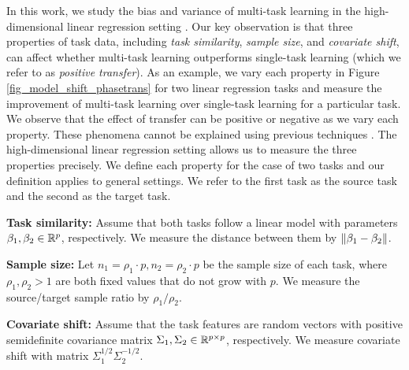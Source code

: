 In this work, we study the bias and variance of multi-task learning in the high-dimensional linear regression setting \cite{HMRT19,BLLT20}.
Our key observation is that three properties of task data, including \textit{task similarity}, \textit{sample size}, and \textit{covariate shift}, can affect whether multi-task learning outperforms single-task learning (which we refer to as \textit{positive transfer}).
As an example, we vary each property in Figure \ref{fig_model_shift_phasetrans} for two linear regression tasks and measure the improvement of multi-task learning over single-task learning for a particular task.
We observe that the effect of transfer can be positive or negative as we vary each property.
These phenomena cannot be explained using previous techniques \cite{WZR20}.
The high-dimensional linear regression setting allows us to measure the three properties precisely.
We define each property for the case of two tasks and our definition applies to general settings.
We refer to the first task as the source task and the second as the target task.
\squishlist
	\item \textbf{Task similarity:} Assume that both tasks follow a linear model with parameters $\beta_1, \beta_2\in\mathbb{R}^p$, respectively.
	We measure the distance between them by $\|\beta_1 - \beta_2\|$.
	\item \textbf{Sample size:} Let $n_1 = \rho_1 \cdot p, n_2 = \rho_2 \cdot p$ be the sample size of each task, where $\rho_1, \rho_2>1$ are both fixed values that do not grow with $p$.
	We measure the source/target sample ratio by $\rho_1 / \rho_2$.
	\item \textbf{Covariate shift:} Assume that the task features are random vectors with positive semidefinite covariance matrix $\Sigma_1,\Sigma_2\in\mathbb{R}^{p\times p}$, respectively.
	We measure covariate shift with matrix $\Sigma_1^{1/2}\Sigma_2^{-1/2}$.
\squishend


